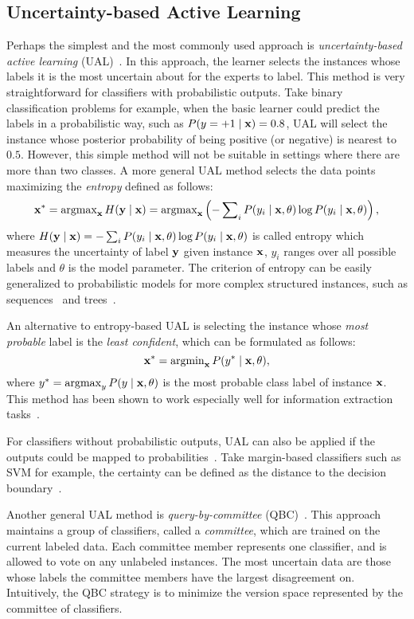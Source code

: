 \subsection{Uncertainty-based Active Learning}

Perhaps the simplest and the most commonly used approach is \textit{uncertainty-based active learning} (\mbox{UAL})~\cite{lewis1994icml,Lewis1994sigir}. In this approach, the learner selects the instances whose labels it is the most uncertain about for the experts to label. This method is very straightforward for classifiers with probabilistic outputs. Take binary classification problems for example, when the basic learner could predict the labels in a probabilistic way, such as $P(y=+1\mid {\bf x})=0.8$, \mbox{UAL} will select the instance whose posterior probability of being positive (or negative) is nearest to $0.5$. However, this simple method will not be suitable in settings where there are more than two classes. A more general \mbox{UAL} method selects the data points maximizing the \textit{entropy} defined as follows:
$${\bf x}^*=\mathop{\rm argmax}\nolimits_{{\bf x}} H({\bf y}\mid{\bf x})=\mathop{\rm argmax}\nolimits_{{\bf x}} \left( -\sum\nolimits_i P(y_i\mid {\bf x},\theta)\log P(y_i\mid {\bf x},\theta)\right),$$
where $H({\bf y}\mid{\bf x})=-\sum_i P(y_i\mid {\bf x},\theta)\log P(y_i\mid {\bf x},\theta)$ is called entropy which measures the uncertainty of label ${\bf y}$ given instance ${\bf x}$, $y_i$ ranges over all possible labels and $\theta$ is the model parameter. The criterion of entropy can be easily generalized to probabilistic models for more complex structured instances, such as sequences~\cite{Settles2008emnlp} and trees~\cite{Hwa2004CL}.

An alternative to entropy-based \mbox{UAL} is selecting the instance whose \textit{most probable} label is the \textit{least confident}, which can be formulated as follows:
$${\bf x}^* = \mathop{\rm argmin}\nolimits_{{\bf x}} P(y^*\mid {\bf x},\theta),$$
where $y^* = \mathop{\rm argmax}_{y}P(y\mid {\bf x}, \theta)$ is the most probable class label of instance ${\bf x}$. This method has been shown to work especially well for information extraction tasks~\cite{Culotta2005aaai,Settles2008emnlp}.

For classifiers without probabilistic outputs, \mbox{UAL} can also be applied if the outputs could be mapped to probabilities~\cite{Lindenbaum2004mlj,Fujii1998CL}. Take margin-based classifiers such as \mbox{SVM} for example, the certainty can be defined as the distance to the decision boundary~\cite{Tong2002jmlr}.

Another general \mbox{UAL} method is \textit{query-by-committee} (\mbox{QBC})~\cite{Seung1992colt}. This approach maintains a group of classifiers, called a \textit{committee}, which are trained on the current labeled data. Each committee member represents one classifier, and is allowed to vote on any unlabeled instances. The most uncertain data are those whose labels the committee members have the largest disagreement on. Intuitively, the \mbox{QBC} strategy is to minimize the version space represented by the committee of classifiers.

